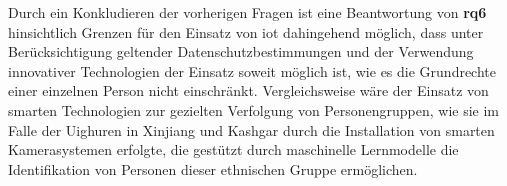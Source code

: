 Durch ein Konkludieren der vorherigen Fragen ist eine Beantwortung von \textbf{\ac{rq}6} hinsichtlich Grenzen für den Einsatz von \ac{iot} dahingehend möglich, dass unter Berücksichtigung geltender Datenschutzbestimmungen und der Verwendung innovativer Technologien der Einsatz soweit möglich ist, wie es die Grundrechte einer einzelnen Person nicht einschränkt. Vergleichsweise wäre der Einsatz von smarten Technologien zur gezielten Verfolgung von Personengruppen, wie sie im Falle der Uighuren in Xinjiang und Kashgar \cite{Drexel2020} durch die Installation von smarten Kamerasystemen erfolgte, die gestützt durch maschinelle Lernmodelle die Identifikation von Personen dieser ethnischen Gruppe ermöglichen.
